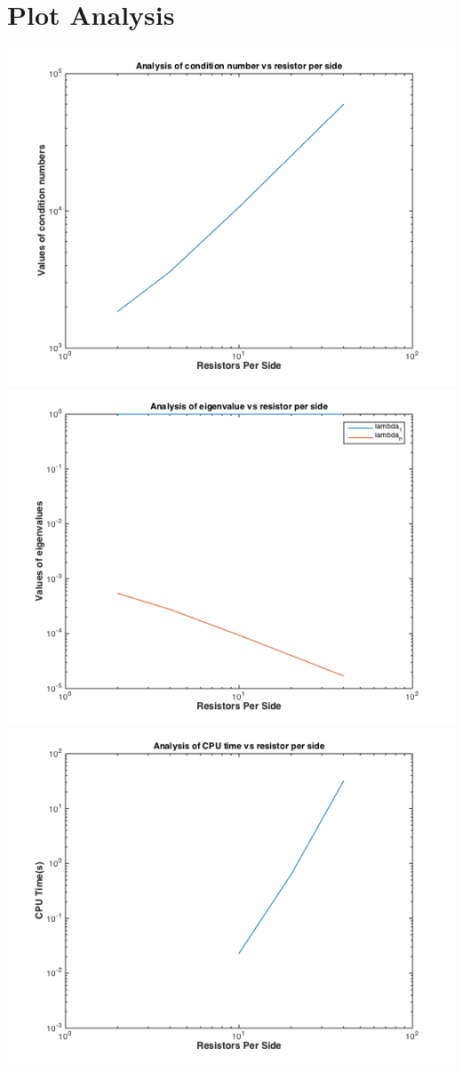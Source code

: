 \documentclass[12pt,a4paper]{article}
\begin{document}
\section{Plot Analysis}
\includegraphics[scale =0.7 ]{./condition_number.png}\\
\includegraphics[scale =0.75]{./eigenvalues.png}\\
\includegraphics[scale =0.75]{./CPUtime.png}\\
\end{document}
